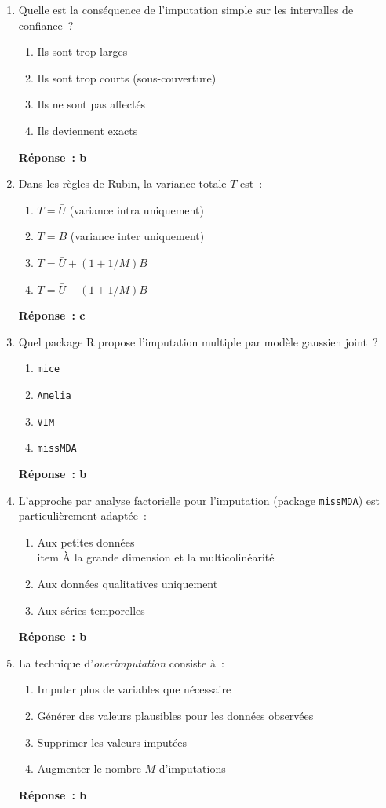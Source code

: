 \documentclass[a4paper,11pt]{article}
\theoremstyle{definition}
\theoremstyle{remark}
\begin{document}
\begin{enumerate}
  \item Quelle est la conséquence de l'imputation simple sur les
    intervalles de confiance~?
    \begin{enumerate}
      \item Ils sont trop larges
      \item Ils sont trop courts (sous-couverture)
      \item Ils ne sont pas affectés
      \item Ils deviennent exacts
    \end{enumerate}
    \textbf{Réponse~: b}

  \item Dans les règles de Rubin, la variance totale $T$ est~:
    \begin{enumerate}
      \item $T = \bar{U}$ (variance intra uniquement)
      \item $T = B$ (variance inter uniquement)
      \item $T = \bar{U} + (1+1/M)B$
      \item $T = \bar{U} - (1+1/M)B$
    \end{enumerate}
    \textbf{Réponse~: c}

  \item Quel package R propose l'imputation multiple par modèle
    gaussien joint~?
    \begin{enumerate}
      \item \texttt{mice}
      \item \texttt{Amelia}
      \item \texttt{VIM}
      \item \texttt{missMDA}
    \end{enumerate}
    \textbf{Réponse~: b}

  \item L'approche par analyse factorielle pour l'imputation
    (package \texttt{missMDA}) est particulièrement adaptée~:
    \begin{enumerate}
      \item Aux petites données
      \\item À la grande dimension et la multicolinéarité
      \item Aux données qualitatives uniquement
      \item Aux séries temporelles
    \end{enumerate}
    \textbf{Réponse~: b}

  \item La technique d'\textit{overimputation} consiste à~:
    \begin{enumerate}
      \item Imputer plus de variables que nécessaire
      \item Générer des valeurs plausibles pour les données observées
      \item Supprimer les valeurs imputées
      \item Augmenter le nombre $M$ d'imputations
    \end{enumerate}
    \textbf{Réponse~: b}


\end{enumerate}
\end{document}

